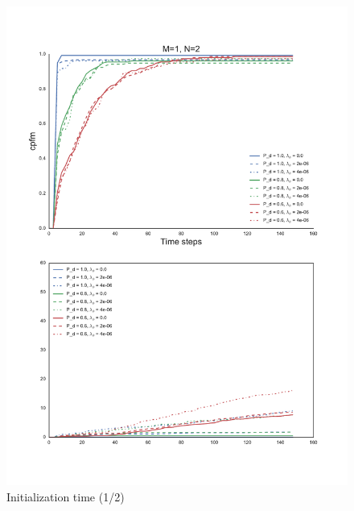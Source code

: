 {\begin{figure}
\centering
\includegraphics[height = .9\textheight]{Figures/plots/Scenario1_Init-Time(1-2).pdf}
\caption{Initialization time (1/2)}\label{fig:init_time_1-2}
\end{figure}

}
